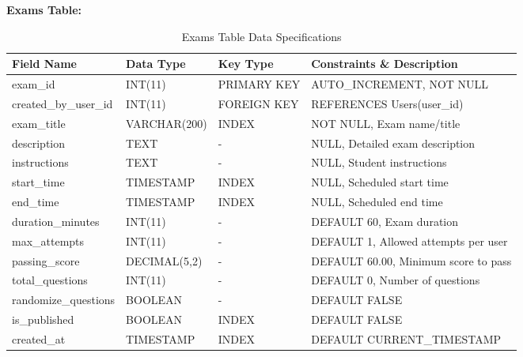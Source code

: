 \documentclass[12pt,a4paper,oneside]{book}
\begin{document}
\textbf{Exams Table:}
\begin{table}[H]
\centering
\caption{Exams Table Data Specifications}
\footnotesize
\begin{tabular}{|L{3cm}|L{2.5cm}|L{1.5cm}|L{5cm}|}
\hline
\textbf{Field Name} & \textbf{Data Type} & \textbf{Key Type} & \textbf{Constraints \& Description} \\
\hline
exam\_id & INT(11) & PRIMARY KEY & AUTO\_INCREMENT, NOT NULL \\
\hline
created\_by\_user\_id & INT(11) & FOREIGN KEY & REFERENCES Users(user\_id) \\
\hline
exam\_title & VARCHAR(200) & INDEX & NOT NULL, Exam name/title \\
\hline
description & TEXT & - & NULL, Detailed exam description \\
\hline
instructions & TEXT & - & NULL, Student instructions \\
\hline
start\_time & TIMESTAMP & INDEX & NULL, Scheduled start time \\
\hline
end\_time & TIMESTAMP & INDEX & NULL, Scheduled end time \\
\hline
duration\_minutes & INT(11) & - & DEFAULT 60, Exam duration \\
\hline
max\_attempts & INT(11) & - & DEFAULT 1, Allowed attempts per user \\
\hline
passing\_score & DECIMAL(5,2) & - & DEFAULT 60.00, Minimum score to pass \\
\hline
total\_questions & INT(11) & - & DEFAULT 0, Number of questions \\
\hline
randomize\_questions & BOOLEAN & - & DEFAULT FALSE \\
\hline
is\_published & BOOLEAN & INDEX & DEFAULT FALSE \\
\hline
created\_at & TIMESTAMP & INDEX & DEFAULT CURRENT\_TIMESTAMP \\
\hline
\end{tabular}
\end{table}
\end{document}
